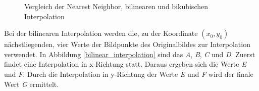 \begin{figure}[htb]
\centering
{}
\caption{Vergleich der Nearest Neighbor, bilinearen und bikubischen Interpolation}
\label{interpolation}
\end{figure}

Bei der bilinearen Interpolation werden die, zu der Koordinate $(x_0, y_0)$ nächstliegenden, vier Werte der Bildpunkte des Originalbildes zur Interpolation verwendet\cite[S.387]{burger:bv}. In Abbildung \ref{bilinear_interpolation} sind das \textit{A}, \textit{B}, \textit{C} und \textit{D}. Zuerst findet eine Interpolation in x-Richtung statt. Daraus ergeben sich die Werte \textit{E} und \textit{F}. Durch die Interpolation in y-Richtung der Werte \textit{E} und \textit{F} wird der finale Wert \textit{G} ermittelt.

